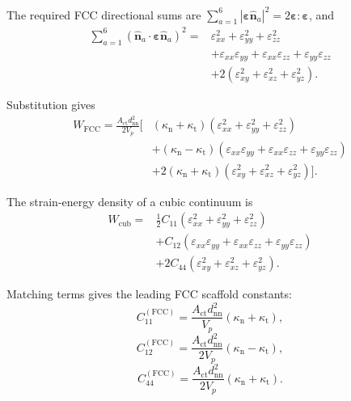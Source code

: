 The required FCC directional sums are $\sum_{a=1}^{6} |\boldsymbol{\varepsilon}\hat{\mathbf{n}}_a|^2 = 2\boldsymbol{\varepsilon}:\boldsymbol{\varepsilon}$, and
\begin{equation}
\begin{aligned}
    \sum_{a=1}^{6} (\hat{\mathbf{n}}_a\cdot \boldsymbol{\varepsilon} \hat{\mathbf{n}}_a)^2 ={}& \varepsilon_{xx}^2 + \varepsilon_{yy}^2 + \varepsilon_{zz}^2 \\
    &+ \varepsilon_{xx}\varepsilon_{yy} + \varepsilon_{xx}\varepsilon_{zz} + \varepsilon_{yy}\varepsilon_{zz} \\
    &+ 2(\varepsilon_{xy}^2+\varepsilon_{xz}^2+\varepsilon_{yz}^2).
\end{aligned}
\end{equation}

Substitution gives
\begin{equation}
\begin{aligned}
    W_{\mathrm{FCC}} = \frac{A_{\mathrm{ct}}d_{\mathrm{nn}}^2}{2V_p} \Big[ & (\kappa_{\mathrm{n}}+\kappa_{\mathrm{t}}) (\varepsilon_{xx}^2+\varepsilon_{yy}^2+\varepsilon_{zz}^2) \\
    & + (\kappa_{\mathrm{n}}-\kappa_{\mathrm{t}}) (\varepsilon_{xx}\varepsilon_{yy} +\varepsilon_{xx}\varepsilon_{zz} +\varepsilon_{yy}\varepsilon_{zz}) \\
    & + 2(\kappa_{\mathrm{n}}+\kappa_{\mathrm{t}}) (\varepsilon_{xy}^2+\varepsilon_{xz}^2+\varepsilon_{yz}^2) \Big].
\end{aligned}
\end{equation}

The strain-energy density of a cubic continuum is
\begin{equation}
\begin{aligned}
    W_{\mathrm{cub}} ={}& \frac{1}{2} C_{11} (\varepsilon_{xx}^2+\varepsilon_{yy}^2+\varepsilon_{zz}^2) \\
    & + C_{12} (\varepsilon_{xx}\varepsilon_{yy} +\varepsilon_{xx}\varepsilon_{zz} +\varepsilon_{yy}\varepsilon_{zz}) \\
    & + 2C_{44} (\varepsilon_{xy}^2+\varepsilon_{xz}^2+\varepsilon_{yz}^2).
\end{aligned}
\end{equation}

Matching terms gives the leading FCC scaffold constants:
\begin{equation}
    C_{11}^{(\mathrm{FCC})} = \frac{A_{\mathrm{ct}}d_{\mathrm{nn}}^2}{V_p} (\kappa_{\mathrm{n}}+\kappa_{\mathrm{t}}),
\end{equation}
\begin{equation}
    C_{12}^{(\mathrm{FCC})} = \frac{A_{\mathrm{ct}}d_{\mathrm{nn}}^2}{2V_p} (\kappa_{\mathrm{n}}-\kappa_{\mathrm{t}}),
\end{equation}
\begin{equation}
    C_{44}^{(\mathrm{FCC})} = \frac{A_{\mathrm{ct}}d_{\mathrm{nn}}^2}{2V_p} (\kappa_{\mathrm{n}}+\kappa_{\mathrm{t}}).
\end{equation}

